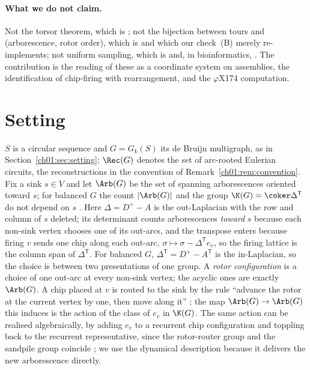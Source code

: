 \paragraph{What we do not claim.} Not the torsor theorem, which is \cite[\S3]{HLMPPW}; not
the bijection between tours and (arborescence, rotor order), which is \cite[Cor.~4.10]{HLMPPW}
and which our check~(B) merely re-implements; not uniform sampling, which is
\cite{CMN,PW,CC} and, in bioinformatics, \cite{AE,KMUW,uShuffle}. The contribution is the
reading of these as a coordinate system on assemblies, the identification of chip-firing
with rearrangement, and the $\varphi$X174 computation.

\section{Setting}\label{ch02:sec:setting}

$S$ is a circular sequence and $G=G_k(S)$ its de Bruijn multigraph, as in
Section~\ref{ch01:sec:setting}; $\Rec(G)$ denotes the set of arc-rooted Eulerian circuits, the
reconstructions in the convention of Remark~\ref{ch01:rem:convention}. Fix a sink $s\in V$ and let $\Arb(G)$ be the set of
spanning arborescences oriented toward $s$; for balanced $G$ the count $|\Arb(G)|$ and the
group $\K(G)=\coker\Delta^{\mathsf T}$ do not depend on $s$ \cite[Lem.~4.12]{HLMPPW}.
Here $\Delta=D^{+}-A$ is the out-Laplacian with the row and column of $s$ deleted; its
determinant counts arborescences \emph{toward} $s$ because each non-sink vertex chooses
one of its out-arcs, and the transpose enters because firing $v$ sends one chip along
each out-arc, $\sigma\mapsto\sigma-\Delta^{\mathsf T}e_v$, so the firing lattice is the
column span of $\Delta^{\mathsf T}$. For balanced $G$, $\Delta^{\mathsf T}=D^{+}-A^{\mathsf T}$
is the in-Laplacian, so the choice is between two presentations of one group. A
\emph{rotor configuration} is a choice of one out-arc at every non-sink vertex; the
acyclic ones are exactly $\Arb(G)$. A chip placed at $v$ is routed to the sink by the
rule ``advance the rotor at the current vertex by one, then move along it''
\cite[\S3]{HLMPPW}; the map $\Arb(G)\to\Arb(G)$ this induces is the action of the class of
$e_v$ in $\K(G)$. The same action can be realised algebraically, by adding $e_v$ to a
recurrent chip configuration and toppling back to the recurrent representative, since
the rotor-router group and the sandpile group coincide \cite[Lem.~3.19]{HLMPPW}; we use
the dynamical description because it delivers the new arborescence directly.


